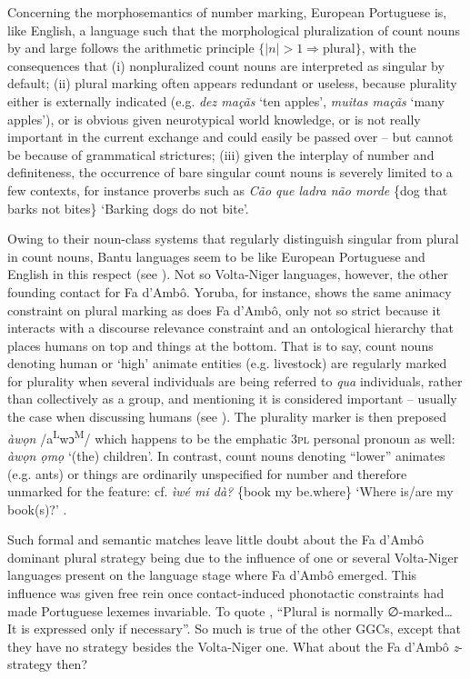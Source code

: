 \documentclass[output=paper]{langscibook}
\begin{document}
Concerning the morphosemantics of number marking, European Portuguese is, like English, a language such that the morphological pluralization of count nouns by and large follows the arithmetic principle $\{|n| > 1 \Rightarrow  \text{plural}\}$, with the consequences that (i) nonpluralized count nouns are interpreted as singular by default; (ii) plural marking often appears redundant or useless, because plurality either is externally indicated (e.g. \textit{dez maçãs} ‘ten apples’, \textit{muitas maçãs} ‘many apples’), or is obvious given neurotypical world knowledge, or is not really important in the current exchange and could easily be passed over -- but cannot be because of grammatical strictures; (iii) given the interplay of number and definiteness, the occurrence of bare singular count nouns is severely limited to a few contexts, for instance proverbs such as \textit{Cão que ladra não morde} \{dog that barks not bites\} ‘Barking dogs do not bite’.

Owing to their noun-class systems that regularly distinguish singular from plural in count nouns, Bantu languages seem to be like European Portuguese and English in this respect (see \citealt{NursePhilippson2006}). Not so Volta-Niger languages, however, the other founding contact for Fa d’Ambô. Yoruba, for instance, shows the same animacy constraint on plural marking as does Fa d’Ambô, only not so strict because it interacts with a discourse relevance constraint and an ontological hierarchy that places humans on top and things at the bottom. That is to say, count nouns denoting human or ‘high’ animate entities (e.g. livestock) are regularly marked for plurality when several individuals are being referred to \textit{qua} individuals, rather than collectively as a group, and mentioning it is considered important -- usually the case when discussing humans (see \citealt{Cartwright1979, Corbett2000, KwonZribi-Hertz2006}). The plurality marker is then preposed \textit{àwọn} /a\textsuperscript{L}wɔ\textsuperscript{M}/ which happens to be the emphatic \textsc{3pl} personal pronoun as well: \textit{àwọn ọmọ} ‘(the) children’. In contrast, count nouns denoting “lower” animates (e.g. ants) or things are ordinarily unspecified for number and therefore unmarked for the feature: cf. \textit{ìwé mi dà?} \{book my be.where\} ‘Where is/are my book(s)?’ \parencites[41]{Rowlands1969}{Bamgboṣe1966}.

Such formal and semantic matches leave little doubt about the Fa d’Ambô dominant plural strategy being due to the influence of one or several Volta-Niger languages present on the language stage where Fa d’Ambô emerged. This influence was given free rein once contact-induced phonotactic constraints had made Portuguese lexemes invariable. To quote \citet{Post2013}, “Plural is normally ∅-marked… It is expressed only if necessary”. So much is true of the other GGCs, except that they have no strategy besides the Volta-Niger one. What about the Fa d’Ambô \textit{z}-strategy then?
\end{document}
